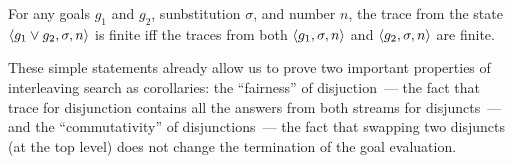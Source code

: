 \begin{lemma}
\label{lem:disj_termination}
For any goals $g_1$ and $g_2$, sunbstitution $\sigma$, and number $n$, the trace from the state $\left<{g_1 \vee g_2, \sigma, n}\right>$ is finite iff the traces from both $\left<{g_1, \sigma, n}\right>$ and $\left<{g_2, \sigma, n}\right>$ are finite.
\end{lemma}

These simple statements already allow us to prove two important properties of interleaving search as corollaries: the ``fairness'' of disjuction~--- the fact that trace for disjunction contains all the answers from both streams for disjuncts~--- and the ``commutativity'' of disjunctions~--- the fact that swapping two disjuncts (at the top level) does not change the termination of the goal evaluation. 
